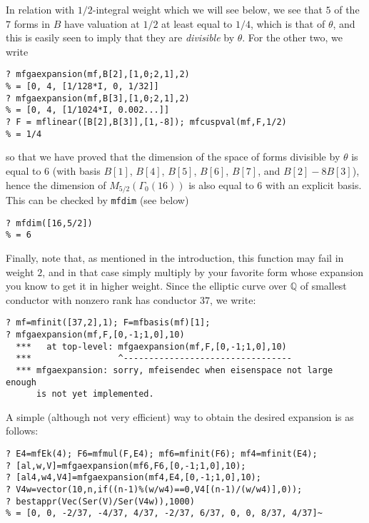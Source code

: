 \documentclass[11pt]{article}
\newcommand{\Q}{{\mathbb Q}}
\renewcommand{\th}{\theta}
\newcommand{\G}{\Gamma}
\def\kbd#1{{\tt #1}}
\begin{document}
In relation with $1/2$-integral weight which we will see below, we see that
$5$ of the $7$ forms in $B$ have valuation at $1/2$ at least equal to $1/4$,
which is that of $\th$, and this is easily seen to imply that they are
\emph{divisible} by $\th$. For the other two, we write

\begin{verbatim}
? mfgaexpansion(mf,B[2],[1,0;2,1],2)
% = [0, 4, [1/128*I, 0, 1/32]]
? mfgaexpansion(mf,B[3],[1,0;2,1],2)
% = [0, 4, [1/1024*I, 0.002...]]
? F = mflinear([B[2],B[3]],[1,-8]); mfcuspval(mf,F,1/2)
% = 1/4
\end{verbatim}

so that we have proved that the dimension of the space of forms divisible
by $\th$ is equal to $6$ (with basis $B[1]$, $B[4]$, $B[5]$, $B[6]$, $B[7]$,
and $B[2]-8B[3]$), hence the dimension of $M_{5/2}(\G_0(16))$ is also equal
to $6$ with an explicit basis. This can be checked by \kbd{mfdim} (see below)

\begin{verbatim}
? mfdim([16,5/2])
% = 6
\end{verbatim}

\smallskip

Finally, note that, as mentioned in the introduction, this function may fail
in weight $2$, and in that case simply multiply by your favorite form whose
expansion you know to get it in higher weight. Since the elliptic curve
over $\Q$ of smallest conductor with nonzero rank has conductor $37$, we
write:

\begin{verbatim}
? mf=mfinit([37,2],1); F=mfbasis(mf)[1];
? mfgaexpansion(mf,F,[0,-1;1,0],10)
  ***   at top-level: mfgaexpansion(mf,F,[0,-1;1,0],10)
  ***                 ^---------------------------------
  *** mfgaexpansion: sorry, mfeisendec when eisenspace not large enough
      is not yet implemented.
\end{verbatim}

A simple (although not very efficient) way to obtain the desired expansion
is as follows:

\begin{verbatim}
? E4=mfEk(4); F6=mfmul(F,E4); mf6=mfinit(F6); mf4=mfinit(E4);
? [al,w,V]=mfgaexpansion(mf6,F6,[0,-1;1,0],10);
? [al4,w4,V4]=mfgaexpansion(mf4,E4,[0,-1;1,0],10);
? V4w=vector(10,n,if((n-1)%(w/w4)==0,V4[(n-1)/(w/w4)],0));
? bestappr(Vec(Ser(V)/Ser(V4w)),1000)
% = [0, 0, -2/37, -4/37, 4/37, -2/37, 6/37, 0, 0, 8/37, 4/37]~
\end{verbatim}
\end{document}
